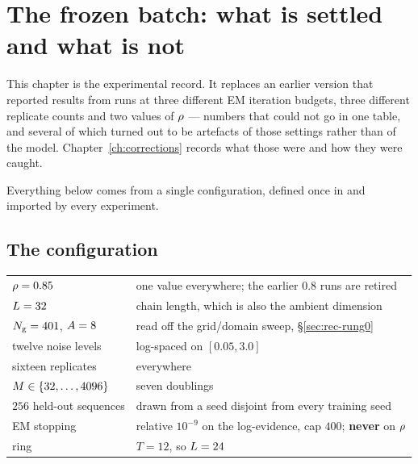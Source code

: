 \chapter{The frozen batch: what is settled and what is not}
\label{ch:status}

This chapter is the experimental record. It replaces an earlier version that reported results
from runs at three different EM iteration budgets, three different replicate counts and two
values of $\rho$ --- numbers that could not go in one table, and several of which turned out to
be artefacts of those settings rather than of the model. Chapter~\ref{ch:corrections} records
what those were and how they were caught.

Everything below comes from a single configuration, defined once in
 and imported by every experiment.

\section{The configuration}

\begin{center}\small
\begin{tabular}{@{}ll@{}}
\toprule
$\rho = 0.85$ & one value everywhere; the earlier $0.8$ runs are retired \\
$L = 32$ & chain length, which is also the ambient dimension \\
$N_{\mathrm{g}} = 401$, $A = 8$ & read off the grid/domain sweep, \S\ref{sec:rec-rung0} \\
twelve noise levels & log-spaced on $[0.05, 3.0]$ \\
sixteen replicates & everywhere \\
$M \in \{32,\dots,4096\}$ & seven doublings \\
$256$ held-out sequences & drawn from a seed disjoint from every training seed \\
EM stopping & relative $10^{-9}$ on the log-evidence, cap $400$; \textbf{never} on $\rho$ \\
ring & $T = 12$, so $L = 24$ \\
\bottomrule
\end{tabular}
\end{center}

